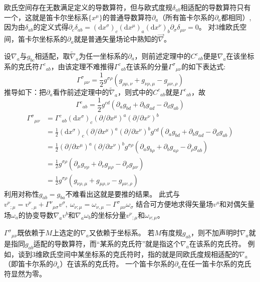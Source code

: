 \begin{example}
欧氏空间存在无数满足定义的导数算符，但与欧式度规$\delta_{ab}$相适配的导数算符只有一个，这就是笛卡尔坐标系$\{x^\mu\}$的普通导数算符$\partial_a$（所有笛卡尔系的$\partial_a$都相同）,因为由$\delta_{ab}$的定义式得$\partial_c\delta_{ab} = (\mathrm{d}x^\sigma)_c(\mathrm{d}x^\mu)_a(\mathrm{d}x^\nu)_b\partial_\sigma\delta_{\mu\nu} = 0$。
对$3$维欧氏空间，笛卡尔坐标系的$\partial_a$就是普通矢量场论中熟知的$\vec{\nabla}$。
\end{example}

设$\nabla_a$与$g_{bc}$相适配，取$\tilde\nabla_a$为任一坐标系的$\partial_a$，则前述定理中的$C^c{}_{ab}$便是$\nabla_a$在该坐标系的克氏符$\Gamma^c{}_{ab}$，由该定理不难推得$\Gamma^c{}_{ab}$在该系的分量$\Gamma^\sigma{}_{\mu\nu}$的如下表达式:
$$\Gamma^\sigma{}_{\mu\nu} = \frac{1}{2}g^{\sigma\rho}(g_{\rho\mu,\nu} + g_{\nu\rho,\mu} - g_{\mu\nu,\rho})$$
推导如下：把$\partial_a$看作前述定理中的$\tilde\nabla_a$，则式中的$C^c{}_{ab}$就是$\Gamma^c{}_{ab}$，故
$$\Gamma^c{}_{ab} = \frac{1}{2}g^{cd}(\partial_ag_{bd} + \partial_bg_{ad} - \partial_dg_{ab})$$
$$\begin{aligned}
\Gamma^\sigma{}_{\mu\nu} & = \Gamma^c{}_{ab}(\mathrm{d}x^\sigma)_c(\partial / \partial x^\mu)^a(\partial / \partial x^\nu)^b \\
& = \frac{1}{2}(\mathrm{d}x^\sigma)_c(\partial / \partial x^\mu)^a(\partial / \partial x^\nu)^bg^{cd}(\partial_ag_{bd} + \partial_bg_{ad} - \partial_dg_{ab}) \\
& = \frac{1}{2}(\partial / \partial x^\mu)^a(\partial / \partial x^\nu)^bg^{\sigma\rho}(\partial_ag_{b\rho} + \partial_bg_{a\rho} - \partial_\rho g_{ab}) \\
& = \frac{1}{2}g^{\sigma\rho}(\partial_\mu g_{\nu\rho} + \partial_\nu g_{\mu\rho} - \partial_\rho g_{\mu\nu}) \\
& = \frac{1}{2}g^{\sigma\rho}(g_{\nu\rho,\mu} + g_{\mu\rho,\nu} - g_{\mu\nu,\rho})
\end{aligned}$$
利用对称性$g_{ab} = g_{ba}$不难看出这就是要推的结果。
此式与
$v^\nu{}_{;\mu} = v^\nu{}_{,\mu} + \Gamma^\nu{}_{\mu\sigma}v^\sigma, ~ \omega_{\nu;\mu} = \omega_{\nu,\mu} - \Gamma^\sigma{}_{\mu\nu}\omega_\sigma$
结合可方便地求得矢量场$v^a$和对偶矢量场$\omega_a$的协变导数$\nabla_av^b$和$\nabla_a\omega_b$的坐标分量$v^\nu{}_{;\mu}$和$\omega_{\nu;\mu}$。

\begin{note}
$\Gamma^\sigma{}_{\mu\nu}$既依赖于$M$上选定的$\nabla_a$又依赖于坐标系。
若$M$有度规$g_{ab}$，则不加声明时$\nabla_a$就是指同$g_{ab}$适配的导数算符，而``某系的克氏符''就是指这个$\nabla_a$在该系的克氏符。
例如，谈到$3$维欧氏空间中某坐标系的克氏符时，指的就是同欧氏度规相适配的$\nabla_a$（即笛卡尔系的$\partial_a$）在该系的克氏符。
一个笛卡尔系的$\partial_a$在任一笛卡尔系的克氏符显然为零。
\end{note}


